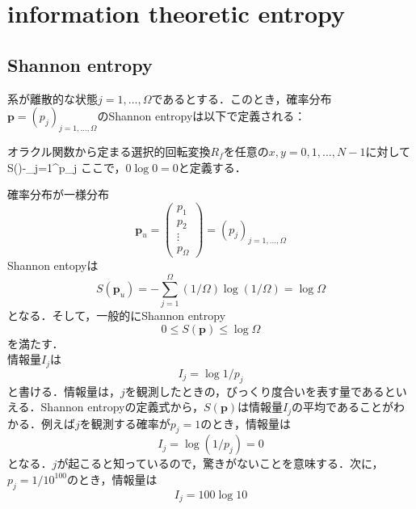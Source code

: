 \section{information theoretic entropy}
\subsection{Shannon entropy}
系が離散的な状態$j=1,\ldots,\Omega$であるとする．このとき，確率分布$\bm{p}=(p_j)_{j=1,\ldots,\Omega}$のShannon entropyは以下で定義される：
\begin{kotak}
	\begin{definition}
	オラクル関数から定まる選択的回転変換$R_f$を任意の$x,y=0,1,\ldots,N-1$に対して
	\be
	S()\equiv-\sum_{j=1}^{\Omega}p_j
	\ee
	ここで，$0\log0=0$と定義する．
	\end{definition}
\end{kotak}
確率分布が一様分布
\begin{equation}
    \bm{p}_u= \left(
        \begin{array}{c}
        p_1 \\
        p_2 \\
        \vdots \\
        p_\Omega
        \end{array}
        \right)
        =(p_j)_{j=1,\ldots,\Omega}
\end{equation}
Shannon entopyは
\begin{equation}
    S(\bm{p}_{u})=-\sum_{j=1}^{\Omega}(1/\Omega)\log{(1/\Omega)}
    =\log{\Omega}
\end{equation}
となる．そして，一般的にShannon entropy
\begin{equation}
    0\leq S(\bm{p})\leq\log{\Omega}
\end{equation}
を満たす．\\
情報量$I_j$は
\begin{equation}
    I_j=\log{1/p_j}
\end{equation}
と書ける．情報量は，$j$を観測したときの，びっくり度合いを表す量であるといえる．Shannon entropyの定義式から，$S(\bm{p})$は情報量$I_j$の平均であることがわかる．例えば$j$を観測する確率が$p_j=1$のとき，情報量は
\begin{equation}
    I_j=\log{(1/p_j)}=0
\end{equation}
となる．$j$が起こると知っているので，驚きがないことを意味する．次に，$p_j=1/10^{100}$のとき，情報量は
\begin{equation}
    I_j=100\log{10}
\end{equation}
